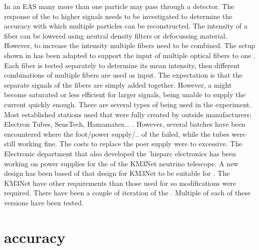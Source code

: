In an EAS many more than one particle may pass through a detector. The
response of the \pmt to higher signals needs to be investigated to
determine the accuracy with which multiple particles can be
reconstructed. The intensity of a fiber can be lowered using neutral
density filters or defocussing material. However, to increase the
intensity multiple fibers need to be combined. The setup shown in
 has been adapted to support the
input of multiple optical fibers to one \pmt. Each fiber is tested
separately to determine its mean intensity, then different combinations
of multiple fibers are used as input. The expectation is that the
separate signals of the fibers are simply added together. However, a
\pmt might become saturated or less efficient for larger signals, being
unable to supply the current quickly enough. There are several types of
\pmt being used in the \hisparc experiment. Most established stations
used \pmts that were fully created by outside manufacturers; Electron
Tubes, SensTech, Hamamatsu... .
However, several batches have been encountered where the foot/power
supply/.. of the \pmt failed, while the tubes were still working fine.
The costs to replace the poer supply were to excessive. The \nikhef
Electronic department that also developed the 'hisparc electronics has
been working on \pmt power supplies for the \pmts of the KM3Net neutrino
telescope. A new design has been based of that design for KM3Net to be
suitable for \hisparc. The KM3Net \pmts have other requirements than
those used for \hisparc so modifications were required. There have been
a couple of iteration of the \hisparc \pmts. Multiple \pmts of each of
these versions have been tested.







\section{\gps accuracy}
\label{sec:gps_accuracy}

